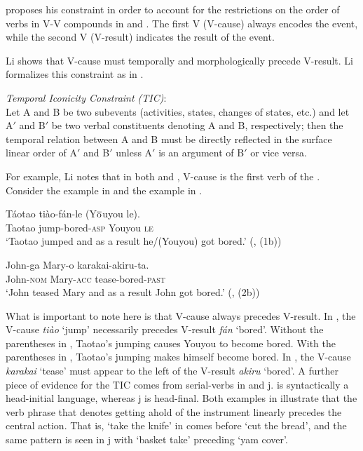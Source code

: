 \documentclass[output=paper]{LSP/langsci}
\begin{document}
\citet[499]{Li1993} proposes his constraint in order to account for the restrictions on the order of verbs in V-V  compounds in  and . The first V (V-cause) always encodes the event, while the second V (V-result) indicates the result of the event. 

Li shows that V-cause must temporally and morphologically precede V-result. Li formalizes this constraint as in .

\begin{exe}

\ex\label{ex:rosen:32}
 \emph{Temporal Iconicity Constraint (TIC)}:\\
 Let A and B be two subevents (activities, states, changes of states, etc.) and let A$'$ and B$'$ be two verbal constituents denoting A and B, respectively; then the temporal relation between A and B must be directly reflected in the surface linear order of A$'$ and B$'$ unless A$'$ is an argument of B$'$ or vice versa.
 
 \end{exe}

For example, Li notes that in both  and , V-cause is the first verb of the . Consider the  example in  and the  example in .

 \begin{exe}
 \ex \label{ex:rosen:33}
 \gll Táotao tiào-fán-le (Y$\overline{\rm{o}}$uyou le).\\
 Taotao jump-bored-\textsc{asp} Youyou \textsc{le}\\
 \glt `Taotao jumped and as a result he/(Youyou) got bored.' (\citealt[480]{Li1993}, (1b))
 
 \ex \label{ex:rosen:34}
\gll John-ga Mary-o karakai-akiru-ta.\\
 John-\textsc{nom} Mary-\textsc{acc} tease-bored-\textsc{past}\\
 \glt `John teased Mary and as a result John got bored.'  (\citealt[481]{Li1993}, (2b))
 
 \end{exe}

What is important to note here is that V-cause always precedes V-result. In , the V-cause \textit{ti\`ao} `jump' necessarily precedes V-result \textit{f\'an} `bored'. Without the parentheses in , Taotao's jumping causes Youyou to become bored. With the parentheses in , Taotao's jumping makes himself become bored. In , the V-cause \textit{karakai} `tease' must appear to the left of the V-result \textit{akiru} `bored'. A further piece of evidence for the TIC comes from serial-verbs in  and j.  is syntactically a head-initial language, whereas j is head-final. Both examples in  illustrate that the verb phrase that denotes getting ahold of the instrument linearly precedes the central action. That is, `take the knife' in  comes before `cut the bread', and the same pattern is seen in j with `basket take' preceding `yam cover'.
\end{document}

